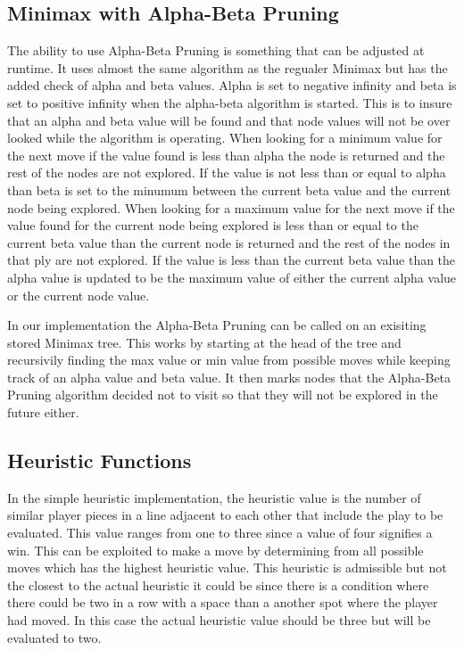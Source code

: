 \documentclass[12pt,letterpaper]{article}
\begin{document}
\subsection{Minimax with Alpha-Beta Pruning}
 The ability to use Alpha-Beta Pruning is something that can be adjusted at runtime. It uses almost the same algorithm as the regualer Minimax but has the added check of alpha and beta values. Alpha is set to negative infinity and beta is set to positive infinity when the alpha-beta algorithm is started. This is to insure that an alpha and beta value will be found and that node values will not be over looked while the algorithm is operating. When looking for a minimum value for the next move if the value found is less than alpha the node is returned and the rest of the nodes are not explored. If the value is not less than or equal to alpha than beta is set to the minumum between the current beta value and the current node being explored. When looking for a maximum value for the next move if the value found for the current node being explored is less than or equal to the current beta value than the current node is returned and the rest of the nodes in that ply are not explored. If the value is less than the current beta value than the alpha value is updated to be the maximum value of either the current alpha value or the current node value. 

In our implementation the Alpha-Beta Pruning can be called on an exisiting stored Minimax tree. This works by starting at the head of the tree and recursivily finding the max value or min value from possible moves while keeping track of an alpha value and beta value.  It then marks nodes that the Alpha-Beta Pruning algorithm decided not to visit so that they will not be explored in the future either. 


\subsection{Heuristic Functions}

In the simple heuristic implementation, the heuristic value is the number of similar player pieces in a line adjacent to each other that include the play to be evaluated. This value ranges from one to three since a value of four signifies a win. This can be exploited to make a move by determining from all possible moves which has the highest heuristic value. This heuristic is admissible but not the closest to the actual heuristic it could be since there is a condition where there could be two in a row with a space than a another spot where the player had moved. In this case the actual heuristic value should be three but will be evaluated to two.
\end{document}
